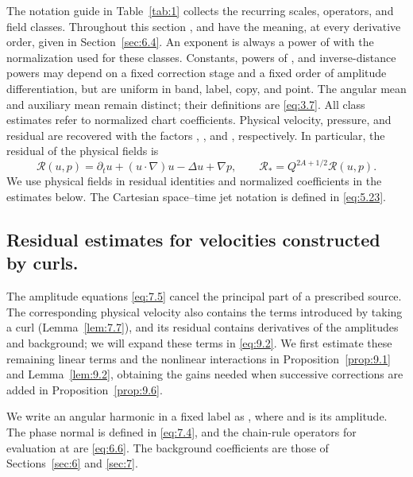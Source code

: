 The notation guide in Table~\ref{tab:1} collects the recurring scales, operators, and field classes.
Throughout this section , and
 have the meaning, at every derivative order,
given in Section~\ref{sec:6.4}. An exponent is always a power of
 with the normalization
%
used for these classes. Constants, powers of , and inverse-distance powers
may depend on a fixed correction stage and a fixed order of amplitude differentiation, but are uniform
in band, label, copy, and point. The angular mean
 and auxiliary mean
 remain distinct; their definitions are \eqref{eq:3.7}.
All class estimates refer to normalized chart coefficients. Physical velocity, pressure, and residual
are recovered with the factors ,
, and , respectively. In
particular, the residual of the physical fields is
\[
\mathscr R(u,p)=\partial_tu+(u\cdot\nabla)u-\Delta u+\nabla p,
\qquad
\mathscr R_*=Q^{2A+1/2}\mathscr R(u,p).
\]
We use physical fields in residual identities and normalized coefficients in the estimates below. The
Cartesian space--time jet notation  is defined in \eqref{eq:5.23}.

\subsection{Residual estimates for velocities constructed by curls.}\label{sec:9.1}
The amplitude equations \eqref{eq:7.5} cancel the principal part of a prescribed source. The
corresponding physical velocity also contains the terms introduced by taking a curl
(Lemma~\ref{lem:7.7}), and its residual contains derivatives of the amplitudes and background; we
will expand these terms in \eqref{eq:9.2}. We first estimate these remaining linear terms and the
nonlinear interactions in Proposition~\ref{prop:9.1} and Lemma~\ref{lem:9.2}, obtaining the gains
needed when successive corrections are added in Proposition~\ref{prop:9.6}.

We write an angular harmonic in a fixed label as
, where
 and
 is its amplitude. The phase normal
 is defined in \eqref{eq:7.4}, and the chain-rule operators for
evaluation at  are \eqref{eq:6.6}. The background coefficients
 are those of Sections~\ref{sec:6} and \ref{sec:7}.

